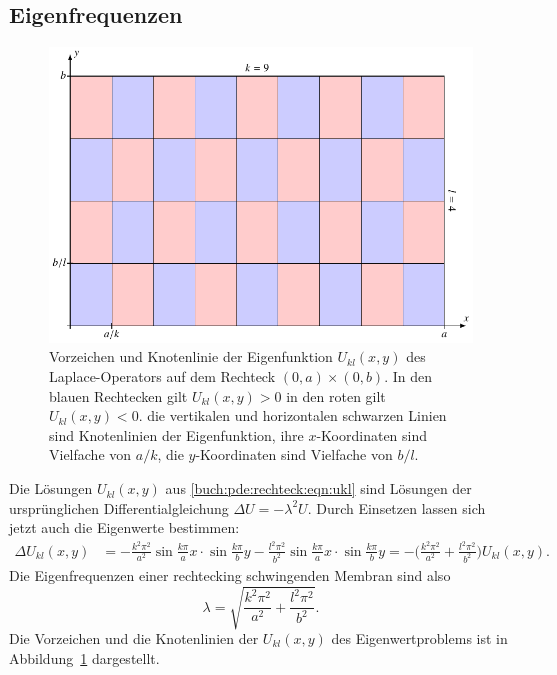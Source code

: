 \subsection{Eigenfrequenzen}
\begin{figure}
\centering
\includegraphics{chapters/090-pde/images/rechteck.pdf}
\caption{Vorzeichen und Knotenlinie der Eigenfunktion
$U_{kl}(x,y)$ des Laplace-Operators auf dem Rechteck $(0,a)\times (0,b)$.
In den blauen Rechtecken gilt $U_{kl}(x,y)>0$ in den roten gilt
$U_{kl}(x,y)<0$.
die vertikalen und horizontalen schwarzen Linien sind Knotenlinien
der Eigenfunktion, ihre $x$-Koordinaten sind Vielfache von $a/k$,
die $y$-Koordinaten sind Vielfache von $b/l$.
\label{buch:pde:rechteck:fig:knoten}}
\end{figure}
Die Lösungen $U_{kl}(x,y)$ aus \eqref{buch:pde:rechteck:eqn:ukl}
sind Lösungen der ursprünglichen Differentialgleichung 
$\Delta U=-\lambda^2 U$.
Durch Einsetzen lassen sich jetzt auch die Eigenwerte bestimmen:
\begin{align*}
\Delta U_{kl}(x,y)
&=
-\frac{k^2\pi^2}{a^2} \sin\frac{k\pi}{a}x\cdot \sin\frac{k\pi}{b}y
-\frac{l^2\pi^2}{b^2} \sin\frac{k\pi}{a}x\cdot \sin\frac{k\pi}{b}y
=
-\biggl(\frac{k^2\pi^2}{a^2}+\frac{l^2\pi^2}{b^2}\biggr) U_{kl}(x,y).
\end{align*}
Die Eigenfrequenzen einer rechtecking schwingenden Membran sind also
\[
\lambda
=
\sqrt{
\frac{k^2\pi^2}{a^2}+\frac{l^2\pi^2}{b^2}
}.
\]
Die Vorzeichen und die Knotenlinien der $U_{kl}(x,y)$ des
Eigenwertproblems ist in Abbildung~\ref{buch:pde:rechteck:fig:knoten}
dargestellt.
